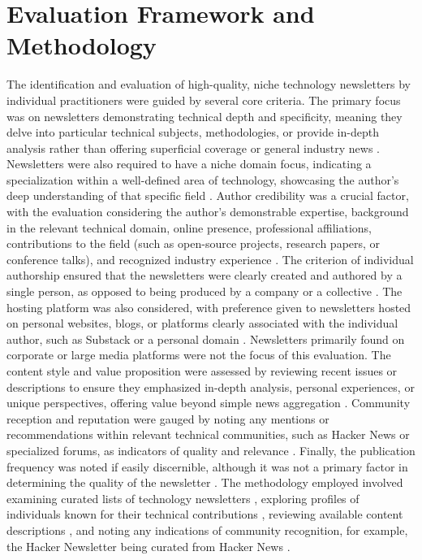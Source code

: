 \documentclass[11pt]{article}
\begin{document}
\section{Evaluation Framework and Methodology}
The identification and evaluation of high-quality, niche technology newsletters by individual practitioners were guided by several core criteria. The primary focus was on newsletters demonstrating technical depth and specificity, meaning they delve into particular technical subjects, methodologies, or provide in-depth analysis rather than offering superficial coverage or general industry news \citep{runcloud2025worlds}. Newsletters were also required to have a niche domain focus, indicating a specialization within a well-defined area of technology, showcasing the author's deep understanding of that specific field \citep{shekhar2025distributedsystems}. Author credibility was a crucial factor, with the evaluation considering the author's demonstrable expertise, background in the relevant technical domain, online presence, professional affiliations, contributions to the field (such as open-source projects, research papers, or conference talks), and recognized industry experience \citep{favikon2025orosz}. The criterion of individual authorship ensured that the newsletters were clearly created and authored by a single person, as opposed to being produced by a company or a collective \citep{atchison2025softwareinsights}. The hosting platform was also considered, with preference given to newsletters hosted on personal websites, blogs, or platforms clearly associated with the individual author, such as Substack or a personal domain \citep{orosz2025jellypod}. Newsletters primarily found on corporate or large media platforms were not the focus of this evaluation. The content style and value proposition were assessed by reviewing recent issues or descriptions to ensure they emphasized in-depth analysis, personal experiences, or unique perspectives, offering value beyond simple news aggregation \citep{orosz2025jellypod}. Community reception and reputation were gauged by noting any mentions or recommendations within relevant technical communities, such as Hacker News or specialized forums, as indicators of quality and relevance \citep{runcloud2025worlds}. Finally, the publication frequency was noted if easily discernible, although it was not a primary factor in determining the quality of the newsletter \citep{shekhar2025distributedsystems}. The methodology employed involved examining curated lists of technology newsletters \citep{runcloud2025worlds}, exploring profiles of individuals known for their technical contributions \citep{favikon2025orosz}, reviewing available content descriptions \citep{orosz2025jellypod}, and noting any indications of community recognition, for example, the Hacker Newsletter being curated from Hacker News \citep{ctoclub2025swe}.
\end{document}
